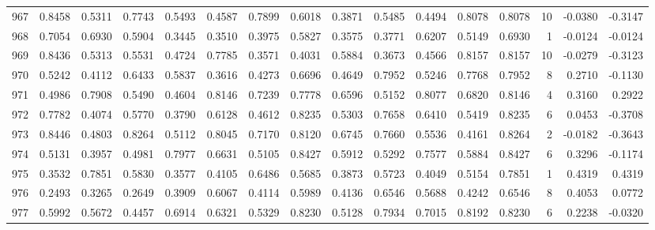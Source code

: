 \begin{tabular}{lrrrrrrrrrrrrrrr}
967 &      0.8458 &  0.5311 &  0.7743 &  0.5493 &  0.4587 &  0.7899 &  0.6018 &  0.3871 &  0.5485 &  0.4494 &   0.8078 &     0.8078 &     10 &                   -0.0380 &                    -0.3147 \\
968 &      0.7054 &  0.6930 &  0.5904 &  0.3445 &  0.3510 &  0.3975 &  0.5827 &  0.3575 &  0.3771 &  0.6207 &   0.5149 &     0.6930 &      1 &                   -0.0124 &                    -0.0124 \\
969 &      0.8436 &  0.5313 &  0.5531 &  0.4724 &  0.7785 &  0.3571 &  0.4031 &  0.5884 &  0.3673 &  0.4566 &   0.8157 &     0.8157 &     10 &                   -0.0279 &                    -0.3123 \\
970 &      0.5242 &  0.4112 &  0.6433 &  0.5837 &  0.3616 &  0.4273 &  0.6696 &  0.4649 &  0.7952 &  0.5246 &   0.7768 &     0.7952 &      8 &                    0.2710 &                    -0.1130 \\
971 &      0.4986 &  0.7908 &  0.5490 &  0.4604 &  0.8146 &  0.7239 &  0.7778 &  0.6596 &  0.5152 &  0.8077 &   0.6820 &     0.8146 &      4 &                    0.3160 &                     0.2922 \\
972 &      0.7782 &  0.4074 &  0.5770 &  0.3790 &  0.6128 &  0.4612 &  0.8235 &  0.5303 &  0.7658 &  0.6410 &   0.5419 &     0.8235 &      6 &                    0.0453 &                    -0.3708 \\
973 &      0.8446 &  0.4803 &  0.8264 &  0.5112 &  0.8045 &  0.7170 &  0.8120 &  0.6745 &  0.7660 &  0.5536 &   0.4161 &     0.8264 &      2 &                   -0.0182 &                    -0.3643 \\
974 &      0.5131 &  0.3957 &  0.4981 &  0.7977 &  0.6631 &  0.5105 &  0.8427 &  0.5912 &  0.5292 &  0.7577 &   0.5884 &     0.8427 &      6 &                    0.3296 &                    -0.1174 \\
975 &      0.3532 &  0.7851 &  0.5830 &  0.3577 &  0.4105 &  0.6486 &  0.5685 &  0.3873 &  0.5723 &  0.4049 &   0.5154 &     0.7851 &      1 &                    0.4319 &                     0.4319 \\
976 &      0.2493 &  0.3265 &  0.2649 &  0.3909 &  0.6067 &  0.4114 &  0.5989 &  0.4136 &  0.6546 &  0.5688 &   0.4242 &     0.6546 &      8 &                    0.4053 &                     0.0772 \\
977 &      0.5992 &  0.5672 &  0.4457 &  0.6914 &  0.6321 &  0.5329 &  0.8230 &  0.5128 &  0.7934 &  0.7015 &   0.8192 &     0.8230 &      6 &                    0.2238 &                    -0.0320 \\

\end{tabular}
